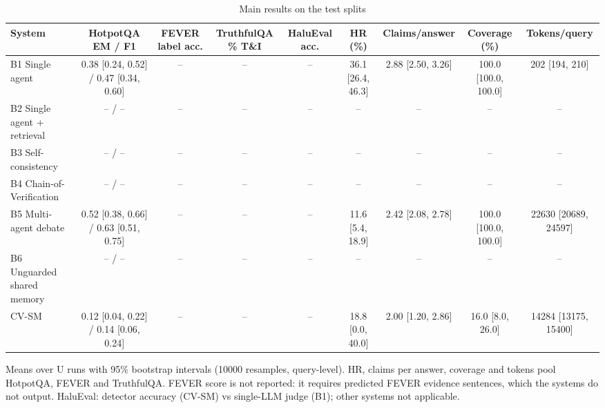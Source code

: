 \begin{table}[!t]
\centering
\caption{Main results on the test splits}
\label{tab:main}
\footnotesize
\begin{tabular}{lcccccccc}
\hline
System & HotpotQA EM / F1 & FEVER label acc. & TruthfulQA \% T\&I & HaluEval acc. & HR (\%) & Claims/answer & Coverage (\%) & Tokens/query \\
\hline
B1 Single agent & 0.38 [0.24, 0.52] / 0.47 [0.34, 0.60] & -- & -- & -- & 36.1 [26.4, 46.3] & 2.88 [2.50, 3.26] & 100.0 [100.0, 100.0] & 202 [194, 210] \\
B2 Single agent + retrieval & -- / -- & -- & -- & -- & -- & -- & -- & -- \\
B3 Self-consistency & -- / -- & -- & -- & -- & -- & -- & -- & -- \\
B4 Chain-of-Verification & -- / -- & -- & -- & -- & -- & -- & -- & -- \\
B5 Multi-agent debate & 0.52 [0.38, 0.66] / 0.63 [0.51, 0.75] & -- & -- & -- & 11.6 [5.4, 18.9] & 2.42 [2.08, 2.78] & 100.0 [100.0, 100.0] & 22630 [20689, 24597] \\
B6 Unguarded shared memory & -- / -- & -- & -- & -- & -- & -- & -- & -- \\
CV-SM & 0.12 [0.04, 0.22] / 0.14 [0.06, 0.24] & -- & -- & -- & 18.8 [0.0, 40.0] & 2.00 [1.20, 2.86] & 16.0 [8.0, 26.0] & 14284 [13175, 15400] \\
\hline
\end{tabular}
\par\smallskip\parbox{\textwidth}{\footnotesize Means over U runs with 95\% bootstrap intervals (10000 resamples, query-level). HR, claims per answer, coverage and tokens pool HotpotQA, FEVER and TruthfulQA. FEVER score is not reported: it requires predicted FEVER evidence sentences, which the systems do not output. HaluEval: detector accuracy (CV-SM) vs single-LLM judge (B1); other systems not applicable.}
\end{table}
